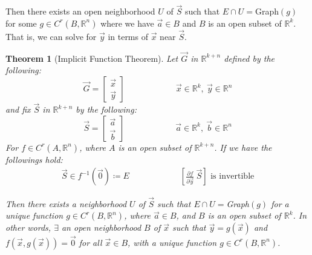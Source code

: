 \documentclass[11pt,oneside]{book}
\theoremstyle{break}
\theoremstyle{break}
\newtheorem{thm}{Theorem}[section]
\newcommand{\R}{\mathbb{R}}
\begin{document}
Then there exists an open neighborhood $U$ of $\vec{S}$ such that $E \cap U = $Graph$(g)$ for some $g \in C^r(B,\R^n)$ where we have $\vec{a}\in B$ and $B$ is an open subset of $\R^k$. That is, we can solve for $\vec{y}$ in terms of $\vec{x}$ near $\vec{S}$. \\


\newpage
\begin{thm}[Implicit Function Theorem]
Let $\vec{G}$ in $\R^{k+n}$ defined by the following:
$$\vec{G} = \begin{bmatrix}
\vec{x} \\ \vec{y}
\end{bmatrix}\qquad\qquad\qquad\vec{x}\in \R^k,\ \vec{y}\in \R^n
$$
and fix $\vec{S}$ in $\R^{k+n}$ by the following:
$$\vec{S} = \begin{bmatrix}
\vec{a} \\ \vec{b}
\end{bmatrix}\qquad\qquad\qquad\vec{a}\in \R^k,\ \vec{b}\in \R^n
$$
For $f \in C^r(A,\R^n)$, where $A$ is an open subset of $\R^{k+n}$. If we have the followings hold:
\begin{align*}
\vec{S} \in f^{-1}(\vec{0}) \coloneqq E \qquad\qquad\qquad \left[\frac{\partial f}{\partial \vec{y}}\ \vec{S}\right] \text{ is invertible}
\end{align*}

Then there exists a neighborhood $U$ of $\vec{S}$ such that $E \cap U = $Graph$(g)$ for a unique function $g \in C^r(B,\R^n)$, where $\vec{a}\in B$, and $B$ is an open subset of $\R^k$. In other words, $\exists$ an open neighborhood $B$ of $\vec{x}$ such that $\vec{y} = g(\vec{x})$ and $f(\vec{x},g(\vec{x})) = \vec{0}$ for all $\vec{x}\in B$, with a unique function $g \in C^r(B,\R^n)$.
\end{thm}
\end{document}
